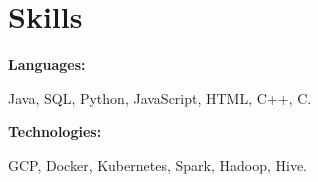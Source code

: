 \documentclass[letterpaper,9pt]{article}
\begin{document}
\begin{minipage}[t]{0.46\textwidth}
\section{\textbf{Skills}}
    
    
    \begin{minipage}[t]{0.2\textwidth}
        \textbf{Languages:}
    \end{minipage}
    \hfill
    \begin{minipage}[t]{0.73\textwidth}
      Java, SQL, Python, JavaScript, HTML, C++, C.  
    \end{minipage}
    \vspace{4mm}
    
    \begin{minipage}[t]{0.2\textwidth}
        \textbf{Technologies:}
    \end{minipage}
    \hfill
    \begin{minipage}[t]{0.73\textwidth}
      GCP, Docker, Kubernetes, Spark, Hadoop, Hive.
    \end{minipage}
    
\end{minipage}
    
\end{document}
